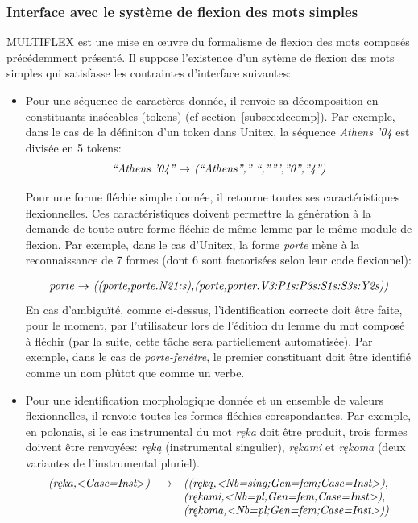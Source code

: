 \subsubsection{Interface avec le système de flexion des mots simples}
\label{Interface}
MULTIFLEX est une mise en {\oe}uvre du formalisme de flexion des mots composés précédemment
présenté. Il suppose l'existence d'un sytème de flexion des mots simples qui satisfasse les
contraintes d'interface suivantes:

\begin{itemize}
\item Pour une séquence de caractères donnée, il renvoie sa décomposition en constituants insécables 
(tokens) (cf section~\ref{subsec:decomp}). Par exemple, dans le cas de la définiton d'un token dans
Unitex, la séquence \emph{Athens '04} est divisée en 5 tokens:
\[
\begin{array}[l]{l}
\emph{``Athens '04'' $\rightarrow$ (``Athens'','' ``,''''',''0'',''4'')}
\end{array}
\]

Pour une forme fléchie simple donnée, il retourne toutes ses caractéristiques flexionnelles. Ces
caractéristiques doivent permettre la génération à la demande de toute autre forme fléchie de même
lemme par le même module de flexion.
Par exemple, dans le cas d'Unitex, la forme \emph{porte} mène à  la reconnaissance de 7 formes 
(dont 6 sont factorisées selon leur code flexionnel):

\[
\begin{array}[l]{l}
\emph{porte $\rightarrow$ ((porte,porte.N21:s),(porte,porter.V3:P1s:P3s:S1s:S3s:Y2s))}
\end{array}
\]
En cas d'ambiguïté, comme ci-dessus, l'identification correcte doit être faite, pour le moment,
par l'utilisateur lors de l'édition du lemme du mot composé à fléchir (par la  suite, cette tâche
sera partiellement automatisée). Par exemple, dans le cas de \emph{porte-fenêtre}, le premier
constituant doit être identifié comme un nom plûtot que comme un verbe.

\item Pour une identification morphologique donnée et un ensemble de valeurs flexionnelles, il
renvoie toutes les formes fléchies corespondantes. Par exemple, en polonais, si le cas instrumental
du mot \emph{r\k{e}ka} doit être produit, trois formes doivent être renvoyées: \emph{r\k{e}k\k{a}} 
(instrumental singulier), \emph{r\k{e}kami} et  \emph{r\k{e}koma} (deux variantes de l'instrumental
pluriel).
\[
\begin{array}[l]{lll}
\emph{(r\k{e}ka,$<$Case=Inst$>$)}&  \rightarrow    &
\emph{((r\k{e}k\k{a},<Nb=sing;Gen=fem;Case=Inst>)}, \\
                                    &              & \emph{(r\k{e}kami,<Nb=pl;Gen=fem;Case=Inst>)},
                                    \\
                                    &              & \emph{(r\k{e}koma,<Nb=pl;Gen=fem;Case=Inst>))}
\end{array}
\]
\end{itemize}

